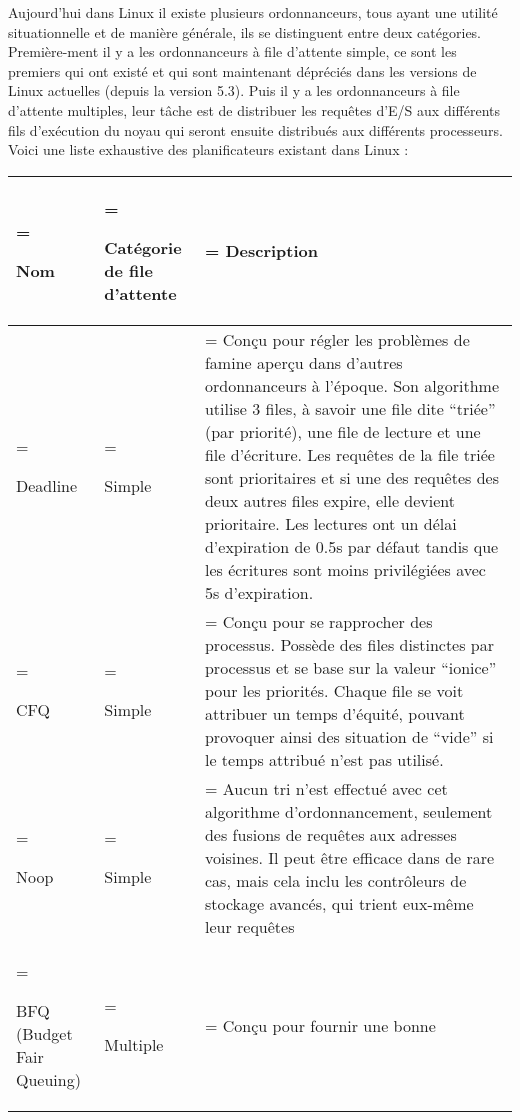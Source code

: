 Aujourd'hui dans Linux il existe plusieurs ordonnanceurs, tous ayant une 
utilité situationnelle et de manière générale, ils se distinguent entre deux 
catégories. Première-ment il y a les ordonnanceurs à file d'attente simple, ce 
sont les premiers qui ont existé et qui sont maintenant dépréciés dans les 
versions de Linux actuelles (depuis la version 5.3). Puis il y a les 
ordonnanceurs à file d'attente multiples, leur tâche est de distribuer les 
requêtes d'E/S aux différents fils d'exécution du noyau qui seront ensuite 
distribués aux différents processeurs. Voici une liste exhaustive des 
planificateurs existant dans Linux :

\begin{center}
    \begin{tabularx}{\textwidth} { 
        | >{\hsize=0.22\hsize\linewidth=\hsize\raggedright\arraybackslash}X 
        | >{\hsize=0.23\hsize\linewidth=\hsize\raggedright\arraybackslash}X 
        | >{\hsize=1.55\hsize\linewidth=\hsize\arraybackslash}X | }
        \hline
        Nom & Catégorie de file d'attente & Description \\
        \hline
        \hline
        Deadline & Simple & Conçu pour régler les problèmes de famine aperçu 
        dans d'autres ordonnanceurs à l'époque. Son algorithme utilise 3 files, 
        à savoir une file dite ``triée'' (par priorité), une file de lecture et 
        une file d'écriture. Les requêtes de la file triée sont prioritaires et 
        si une des requêtes des deux autres files expire, elle devient 
        prioritaire. Les lectures ont un délai d'expiration de 0.5s par défaut 
        tandis que les écritures sont moins privilégiées avec 5s d'expiration. 
        \\
        \hline
        CFQ & Simple & Conçu pour se rapprocher des processus. Possède des 
        files distinctes par processus et se base sur la valeur ``ionice'' pour 
        les priorités. Chaque file se voit attribuer un temps d'équité, pouvant 
        provoquer ainsi des situation de ``vide'' si le temps attribué n'est 
        pas utilisé. \\
        \hline
        Noop & Simple & Aucun tri n'est effectué avec cet algorithme 
        d'ordonnancement, seulement des fusions de requêtes aux adresses 
        voisines. Il peut être efficace dans de rare cas, mais cela inclu les 
        contrôleurs de stockage avancés, qui trient eux-même leur requêtes \\
        \hline
        BFQ (Budget Fair Queuing) & Multiple & Conçu pour fournir une bonne 

\end{tabularx}
\end{center}
